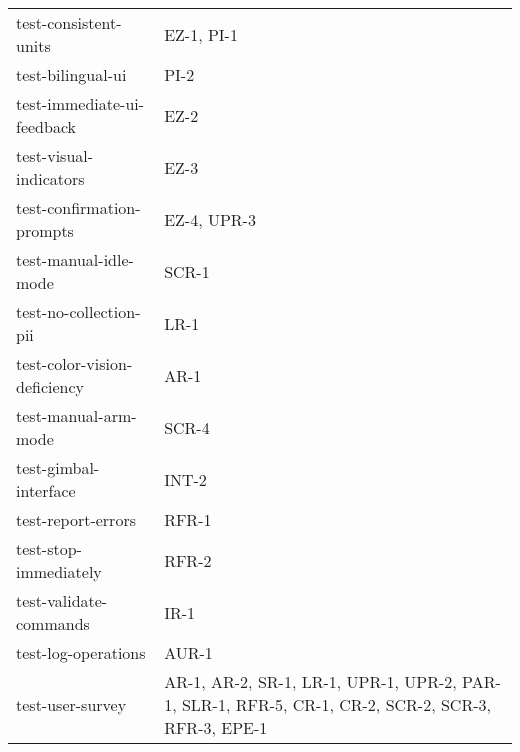 \documentclass[12pt, titlepage]{article}
\begin{document}
\begin{tabularx}{\textwidth}{p{5cm}X}
  test-consistent-units        & EZ-1, PI-1                                                                                        \\
  test-bilingual-ui            & PI-2                                                                                              \\
  test-immediate-ui-feedback   & EZ-2                                                                                              \\
  test-visual-indicators       & EZ-3                                                                                              \\
  test-confirmation-prompts    & EZ-4, UPR-3                                                                                       \\
  test-manual-idle-mode        & SCR-1                                                                                             \\
  test-no-collection-pii       & LR-1                                                                                              \\
  test-color-vision-deficiency & AR-1                                                                                              \\
  test-manual-arm-mode         & SCR-4                                                                                             \\
  test-gimbal-interface        & INT-2                                                                                             \\
  test-report-errors           & RFR-1                                                                                             \\
  test-stop-immediately        & RFR-2                                                                                             \\
  test-validate-commands       & IR-1                                                                                              \\
  test-log-operations          & AUR-1                                                                                             \\
  test-user-survey             & AR-1, AR-2, SR-1, LR-1, UPR-1, UPR-2, PAR-1, SLR-1, RFR-5, CR-1, CR-2, SCR-2, SCR-3, RFR-3, EPE-1 \\
  \bottomrule
\end{tabularx}
\end{document}

